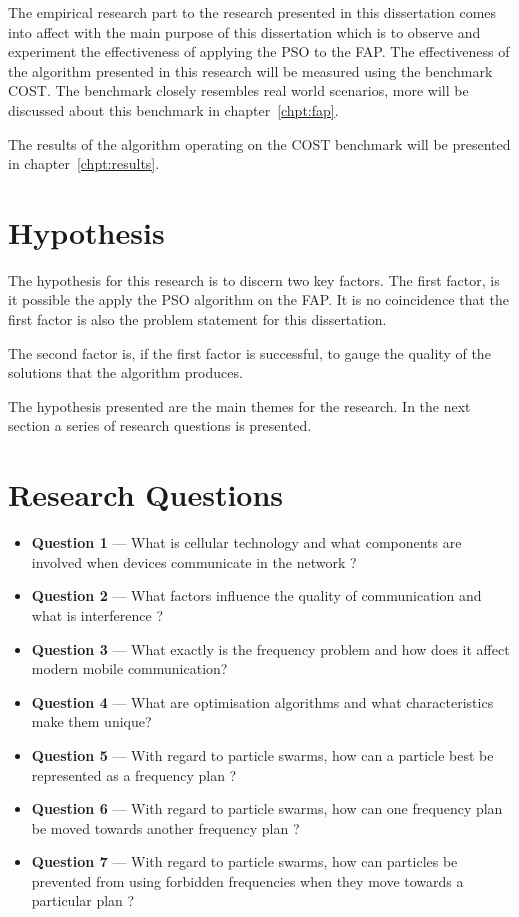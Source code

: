 The empirical research part to the research presented in this dissertation comes into affect with the main purpose of this dissertation which is to observe and experiment the effectiveness of applying the \gls{PSO} to the \gls{FAP}. The effectiveness of the algorithm presented in this research will be measured using the benchmark \gls{COST}. The benchmark closely resembles real world scenarios, more will be discussed about this benchmark in chapter~\ref{chpt:fap}.

The results of the algorithm operating on the \gls{COST} benchmark will be presented in chapter~\ref{chpt:results}. 
\section{Hypothesis}
The hypothesis for this research is to discern two key factors. The first factor, is it possible the apply the \gls{PSO} algorithm on the \gls{FAP}. It is no coincidence that the first factor is also the problem statement for this dissertation.

The second factor is, if the first factor is successful, to gauge the quality of the solutions that the algorithm produces.

The hypothesis presented are the main themes for the research. In the next section a series of research questions is presented.
\section{Research Questions}
\begin{itemize}
\item \textbf{Question 1} --- What is cellular technology and what components are involved when devices communicate in the network ?
\item \textbf{Question 2} --- What factors influence the quality of communication and what is interference ?
\item \textbf{Question 3} --- What exactly is the frequency problem and how does it affect modern mobile communication?
\item \textbf{Question 4} --- What are optimisation algorithms and what characteristics make them unique?
\item \textbf{Question 5} --- With regard to particle swarms, how can a particle best be represented as a frequency plan ?
\item \textbf{Question 6} --- With regard to particle swarms, how can one frequency plan be moved towards another frequency plan ?
\item \textbf{Question 7} --- With regard to particle swarms, how can particles be prevented from using forbidden frequencies when they move towards a particular plan ?
\end{itemize}

